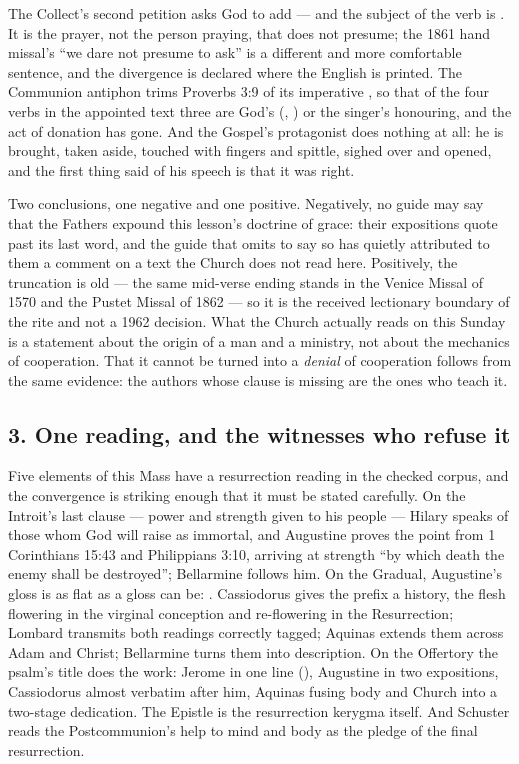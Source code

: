 The Collect's second petition asks God to add  --- and the subject of the verb is . It is the prayer,
not the person praying, that does not presume; the 1861 hand missal's ``we dare
not presume to ask'' is a different and more comfortable sentence, and the
divergence is declared where the English is printed. The Communion antiphon
trims Proverbs 3:9 of its imperative , so that of the four verbs
in the appointed text three are God's (,
) or the singer's honouring, and the act of donation has
gone. And the Gospel's protagonist does nothing at all: he is brought, taken
aside, touched with fingers and spittle, sighed over and opened, and the first
thing said of his speech is that it was right.

Two conclusions, one negative and one positive. Negatively, no guide may say
that the Fathers expound this lesson's doctrine of grace: their expositions
quote past its last word, and the guide that omits to say so has quietly
attributed to them a comment on a text the Church does not read here.
Positively, the truncation is old --- the same mid-verse ending stands in the
Venice Missal of 1570 and the Pustet Missal of 1862 --- so it is the received
lectionary boundary of the rite and not a 1962 decision. What the Church
actually reads on this Sunday is a statement about the origin of a man and a
ministry, not about the mechanics of cooperation. That it cannot be turned into
a \textit{denial} of cooperation follows from the same evidence: the authors
whose clause is missing are the ones who teach it.

\subsection*{3. One reading, and the witnesses who refuse it}

Five elements of this Mass have a resurrection reading in the checked corpus,
and the convergence is striking enough that it must be stated carefully. On the
Introit's last clause --- power and strength given to his people --- Hilary
speaks of those whom God will raise as immortal, and Augustine proves the point
from 1 Corinthians 15:43 and Philippians 3:10, arriving at strength ``by which
death the enemy shall be destroyed''; Bellarmine follows him. On the Gradual,
Augustine's gloss is as flat as a gloss can be: . Cassiodorus gives the prefix a history, the
flesh flowering in the virginal conception and re-flowering in the
Resurrection; Lombard transmits both readings correctly tagged; Aquinas extends
them across Adam and Christ; Bellarmine turns them into description. On the
Offertory the psalm's title does the work: Jerome in one line
(), Augustine
in two expositions, Cassiodorus almost verbatim after him, Aquinas fusing body
and Church into a two-stage dedication. The Epistle is the resurrection
kerygma itself. And Schuster reads the Postcommunion's help to mind and body as
the pledge of the final resurrection.


